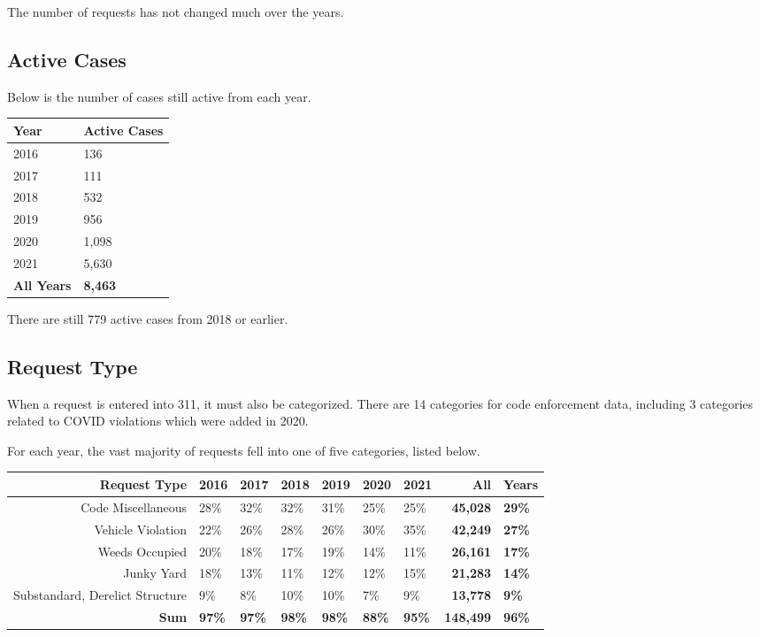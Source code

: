 \documentclass[
]{book}
\begin{document}
The number of requests has not changed much over the years.

\hypertarget{active-cases}{%
\subsection{Active Cases}\label{active-cases}}

Below is the number of cases still active from each year.

\begin{longtable}[]{@{}ll@{}}
\toprule
Year & Active Cases \\
\midrule
\endhead
2016 & 136 \\
2017 & 111 \\
2018 & 532 \\
2019 & 956 \\
2020 & 1,098 \\
2021 & 5,630 \\
\textbf{All Years} & \textbf{8,463} \\
\bottomrule
\end{longtable}

There are still 779 active cases from 2018 or earlier.

\hypertarget{request-type}{%
\subsection{Request Type}\label{request-type}}

When a request is entered into 311, it must also be categorized. There are 14 categories for code enforcement data, including 3 categories related to COVID violations which were added in 2020.

For each year, the vast majority of requests fell into one of five categories, listed below.

\begin{longtable}[]{@{}rllllllrl@{}}
\toprule
Request Type & 2016 & 2017 & 2018 & 2019 & 2020 & 2021 & All & Years \\
\midrule
\endhead
Code Miscellaneous & 28\% & 32\% & 32\% & 31\% & 25\% & 25\% & \textbf{45,028} & \textbf{29\%} \\
Vehicle Violation & 22\% & 26\% & 28\% & 26\% & 30\% & 35\% & \textbf{42,249} & \textbf{27\%} \\
Weeds Occupied & 20\% & 18\% & 17\% & 19\% & 14\% & 11\% & \textbf{26,161} & \textbf{17\%} \\
Junky Yard & 18\% & 13\% & 11\% & 12\% & 12\% & 15\% & \textbf{21,283} & \textbf{14\%} \\
Substandard, Derelict Structure & 9\% & 8\% & 10\% & 10\% & 7\% & 9\% & \textbf{13,778} & \textbf{9\%} \\
\textbf{Sum} & \textbf{97\%} & \textbf{97\%} & \textbf{98\%} & \textbf{98\%} & \textbf{88\%} & \textbf{95\%} & \textbf{148,499} & \textbf{96\%} \\
\bottomrule
\end{longtable}
\end{document}
